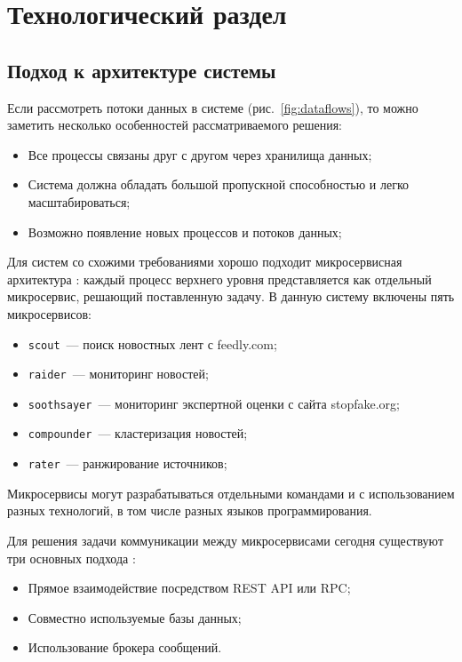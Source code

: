 \chapter{Технологический раздел}
\section{Подход к архитектуре системы}
Если рассмотреть потоки данных в системе (рис.~\ref{fig:dataflows}), то можно заметить несколько особенностей рассматриваемого решения:
\begin{itemize}
    \item Все процессы связаны друг с другом через хранилища данных;
    \item Система должна обладать большой пропускной способностью и легко масштабироваться;
    \item Возможно появление новых процессов и потоков данных;
\end{itemize}

Для систем со схожими требованиями хорошо подходит микросервисная архитектура \cite{kleppmann17}: каждый процесс верхнего уровня представляется как отдельный микросервис, решающий поставленную задачу. В данную систему включены пять микросервисов:
\begin{itemize}
    \item \verb|scout|~--- поиск новостных лент с feedly.com;
    \item \verb|raider|~--- мониторинг новостей;
    \item \verb|soothsayer|~--- мониторинг экспертной оценки с сайта stopfake.org;
    \item \verb|compounder|~--- кластеризация новостей;
    \item \verb|rater|~--- ранжирование источников;
\end{itemize}

Микросервисы могут разрабатываться отдельными командами и с использованием разных технологий, в том числе разных языков программирования.

Для решения задачи коммуникации между микросервисами сегодня существуют три основных подхода \cite{neuman15}:
\begin{itemize}
    \item Прямое взаимодействие посредством REST API или RPC;
    \item Совместно используемые базы данных;
    \item Использование брокера сообщений.
\end{itemize}


